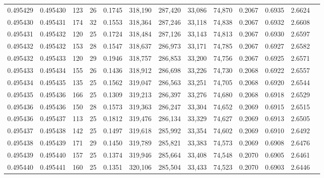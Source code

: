 \begin{tabular}{rrrrrrrrrrrrr}
0.495429 & 0.495430 & 123 &  26 &                                     0.1745 & 318,190 & 287,420 &  33,086 &  74,870 & 0.2067 & 0.6935 & 2.6624 \\
0.495430 & 0.495431 & 174 &  32 &                                     0.1553 & 318,364 & 287,246 &  33,118 &  74,838 & 0.2067 & 0.6932 & 2.6608 \\
0.495431 & 0.495432 & 120 &  25 &                                     0.1724 & 318,484 & 287,126 &  33,143 &  74,813 & 0.2067 & 0.6930 & 2.6597 \\
0.495432 & 0.495432 & 153 &  28 &                                     0.1547 & 318,637 & 286,973 &  33,171 &  74,785 & 0.2067 & 0.6927 & 2.6582 \\
0.495432 & 0.495433 & 120 &  29 &                                     0.1946 & 318,757 & 286,853 &  33,200 &  74,756 & 0.2067 & 0.6925 & 2.6571 \\
0.495433 & 0.495434 & 155 &  26 &                                     0.1436 & 318,912 & 286,698 &  33,226 &  74,730 & 0.2068 & 0.6922 & 2.6557 \\
0.495434 & 0.495435 & 135 &  25 &                                     0.1562 & 319,047 & 286,563 &  33,251 &  74,705 & 0.2068 & 0.6920 & 2.6544 \\
0.495435 & 0.495436 & 166 &  25 &                                     0.1309 & 319,213 & 286,397 &  33,276 &  74,680 & 0.2068 & 0.6918 & 2.6529 \\
0.495436 & 0.495436 & 150 &  28 &                                     0.1573 & 319,363 & 286,247 &  33,304 &  74,652 & 0.2069 & 0.6915 & 2.6515 \\
0.495436 & 0.495437 & 113 &  25 &                                     0.1812 & 319,476 & 286,134 &  33,329 &  74,627 & 0.2069 & 0.6913 & 2.6505 \\
0.495437 & 0.495438 & 142 &  25 &                                     0.1497 & 319,618 & 285,992 &  33,354 &  74,602 & 0.2069 & 0.6910 & 2.6492 \\
0.495438 & 0.495439 & 171 &  29 &                                     0.1450 & 319,789 & 285,821 &  33,383 &  74,573 & 0.2069 & 0.6908 & 2.6476 \\
0.495439 & 0.495440 & 157 &  25 &                                     0.1374 & 319,946 & 285,664 &  33,408 &  74,548 & 0.2070 & 0.6905 & 2.6461 \\
0.495440 & 0.495441 & 160 &  25 &                                     0.1351 & 320,106 & 285,504 &  33,433 &  74,523 & 0.2070 & 0.6903 & 2.6446 \\

\end{tabular}
